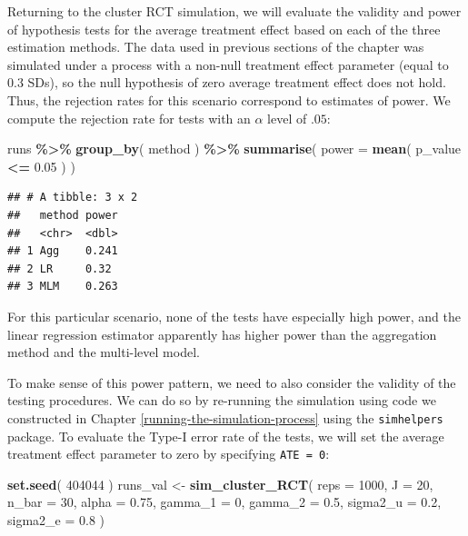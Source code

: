 \documentclass[
]{book}
\newenvironment{Shaded}{\begin{snugshade}}{\end{snugshade}}
\newcommand{\AttributeTok}[1]{\textcolor[rgb]{0.13,0.29,0.53}{#1}}
\newcommand{\DecValTok}[1]{\textcolor[rgb]{0.00,0.00,0.81}{#1}}
\newcommand{\FloatTok}[1]{\textcolor[rgb]{0.00,0.00,0.81}{#1}}
\newcommand{\FunctionTok}[1]{\textcolor[rgb]{0.13,0.29,0.53}{\textbf{#1}}}
\newcommand{\NormalTok}[1]{#1}
\newcommand{\OtherTok}[1]{\textcolor[rgb]{0.56,0.35,0.01}{#1}}
\newcommand{\SpecialCharTok}[1]{\textcolor[rgb]{0.81,0.36,0.00}{\textbf{#1}}}
\begin{document}
Returning to the cluster RCT simulation, we will evaluate the validity and power of hypothesis tests for the average treatment effect based on each of the three estimation methods.
The data used in previous sections of the chapter was simulated under a process with a non-null treatment effect parameter (equal to 0.3 SDs), so the null hypothesis of zero average treatment effect does not hold.
Thus, the rejection rates for this scenario correspond to estimates of power.
We compute the rejection rate for tests with an \(\alpha\) level of \(.05\):

\begin{Shaded}
\begin{Highlighting}[]
\NormalTok{runs }\SpecialCharTok{\%\textgreater{}\%} 
  \FunctionTok{group\_by}\NormalTok{( method ) }\SpecialCharTok{\%\textgreater{}\%}
  \FunctionTok{summarise}\NormalTok{( }\AttributeTok{power =} \FunctionTok{mean}\NormalTok{( p\_value }\SpecialCharTok{\textless{}=} \FloatTok{0.05}\NormalTok{ ) )}
\end{Highlighting}
\end{Shaded}

\begin{verbatim}
## # A tibble: 3 x 2
##   method power
##   <chr>  <dbl>
## 1 Agg    0.241
## 2 LR     0.32 
## 3 MLM    0.263
\end{verbatim}

For this particular scenario, none of the tests have especially high power, and the linear regression estimator apparently has higher power than the aggregation method and the multi-level model.

To make sense of this power pattern, we need to also consider the validity of the testing procedures.
We can do so by re-running the simulation using code we constructed in Chapter \ref{running-the-simulation-process} using the \texttt{simhelpers} package.
To evaluate the Type-I error rate of the tests, we will set the average treatment effect parameter to zero by specifying \texttt{ATE\ =\ 0}:

\begin{Shaded}
\begin{Highlighting}[]
\FunctionTok{set.seed}\NormalTok{( }\DecValTok{404044}\NormalTok{ )}
\NormalTok{runs\_val }\OtherTok{\textless{}{-}} \FunctionTok{sim\_cluster\_RCT}\NormalTok{( }
  \AttributeTok{reps =} \DecValTok{1000}\NormalTok{, }
  \AttributeTok{J =} \DecValTok{20}\NormalTok{, }\AttributeTok{n\_bar =} \DecValTok{30}\NormalTok{, }\AttributeTok{alpha =} \FloatTok{0.75}\NormalTok{,}
  \AttributeTok{gamma\_1 =} \DecValTok{0}\NormalTok{, }\AttributeTok{gamma\_2 =} \FloatTok{0.5}\NormalTok{,}
  \AttributeTok{sigma2\_u =} \FloatTok{0.2}\NormalTok{, }\AttributeTok{sigma2\_e =} \FloatTok{0.8}
\NormalTok{)}
\end{Highlighting}
\end{Shaded}
\end{document}
